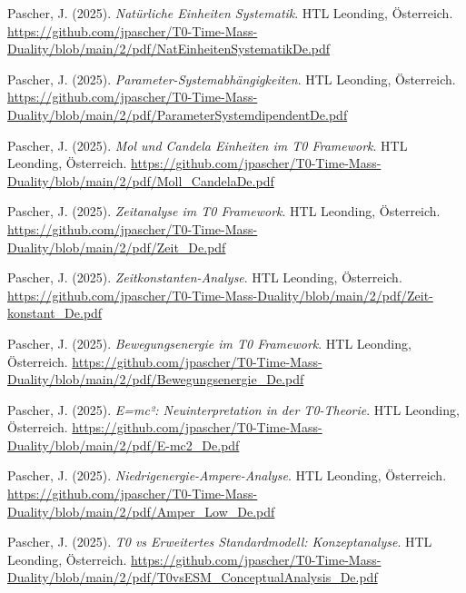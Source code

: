 \documentclass{article}
\begin{document}
\begin{thebibliography}{99}
		Pascher, J. (2025).
		\textit{Natürliche Einheiten Systematik}.
		HTL Leonding, Österreich.
		\url{https://github.com/jpascher/T0-Time-Mass-Duality/blob/main/2/pdf/NatEinheitenSystematikDe.pdf}
		
		Pascher, J. (2025).
		\textit{Parameter-Systemabhängigkeiten}.
		HTL Leonding, Österreich.
		\url{https://github.com/jpascher/T0-Time-Mass-Duality/blob/main/2/pdf/ParameterSystemdipendentDe.pdf}
		
		Pascher, J. (2025).
		\textit{Mol und Candela Einheiten im T0 Framework}.
		HTL Leonding, Österreich.
		\url{https://github.com/jpascher/T0-Time-Mass-Duality/blob/main/2/pdf/Moll_CandelaDe.pdf}
		
		
		Pascher, J. (2025).
		\textit{Zeitanalyse im T0 Framework}.
		HTL Leonding, Österreich.
		\url{https://github.com/jpascher/T0-Time-Mass-Duality/blob/main/2/pdf/Zeit_De.pdf}
		
		Pascher, J. (2025).
		\textit{Zeitkonstanten-Analyse}.
		HTL Leonding, Österreich.
		\url{https://github.com/jpascher/T0-Time-Mass-Duality/blob/main/2/pdf/Zeit-konstant_De.pdf}
		
		Pascher, J. (2025).
		\textit{Bewegungsenergie im T0 Framework}.
		HTL Leonding, Österreich.
		\url{https://github.com/jpascher/T0-Time-Mass-Duality/blob/main/2/pdf/Bewegungsenergie_De.pdf}
		
		Pascher, J. (2025).
		\textit{E=mc²: Neuinterpretation in der T0-Theorie}.
		HTL Leonding, Österreich.
		\url{https://github.com/jpascher/T0-Time-Mass-Duality/blob/main/2/pdf/E-mc2_De.pdf}
		
		Pascher, J. (2025).
		\textit{Niedrigenergie-Ampere-Analyse}.
		HTL Leonding, Österreich.
		\url{https://github.com/jpascher/T0-Time-Mass-Duality/blob/main/2/pdf/Amper_Low_De.pdf}
		
		
		Pascher, J. (2025).
		\textit{T0 vs Erweitertes Standardmodell: Konzeptanalyse}.
		HTL Leonding, Österreich.
		\url{https://github.com/jpascher/T0-Time-Mass-Duality/blob/main/2/pdf/T0vsESM_ConceptualAnalysis_De.pdf}
		

\end{thebibliography}
\end{document}
